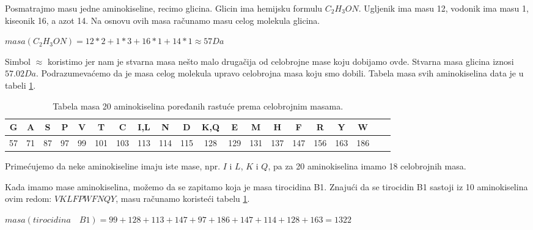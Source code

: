 Posmatrajmo masu jedne aminokiseline, recimo glicina. Glicin ima hemijsku formulu $ C_{2}H_{3}ON $. Ugljenik ima masu 12, vodonik ima masu 1, kiseonik 16, a azot 14. Na osnovu ovih masa računamo masu celog molekula glicina.
\begin{center}
$  masa(C_{2}H_{3}ON) = 12*2 + 1*3 + 16*1 + 14*1 \approx 57 Da $
\end{center}

\noindent Simbol  $ \approx $ koristimo jer nam je stvarna masa nešto malo drugačija od celobrojne mase koju dobijamo ovde. Stvarna masa glicina iznosi $ 57.02 Da $. Podrazumevaćemo da je masa celog molekula upravo celobrojna masa koju smo dobili. Tabela masa svih aminokiselina data je u tabeli \ref{tabela:mase}.

\begin{center}
\begin{table} [h!]
\centering
\caption{Tabela masa 20 aminokiselina poređanih rastuće prema celobrojnim masama.}
\label{tabela:mase}
\begin{tabular}{ |c|c|c|c|c|c|c|c|c|c|c|c|c|c|c|c|c|c|c|c| } 
 \hline
 G & A & S & P & V & T & C & I,L & N &  D & K,Q & E & M & H & F & R & Y & W\\ 
 \hline 
 57 & 71 & 87 & 97 & 99 & 101 & 103 & 113 & 114 & 115 & 128 & 129 & 131 & 137 & 147 & 156 & 163 & 186 \\ 
 \hline
\end{tabular}
\end{table}
\end{center}

Primećujemo da neke aminokiseline imaju iste mase, npr. $I$ i $L$, $K$ i $Q$, pa za 20 aminokiselina imamo 18 celobrojnih masa.

Kada imamo mase aminokiselina, možemo da se zapitamo koja je masa tirocidina B1. Znajući da se tirocidin B1 sastoji iz 10 aminokiselina ovim redom: $ VKLFPWFNQY $, masu računamo koristeći tabelu \ref{tabela:mase}. 

\begin{center}
$  masa(tirocidina \quad B1) = 99+128+113+147+97+186+147+114+128+163 = 1322 $
\end{center}

